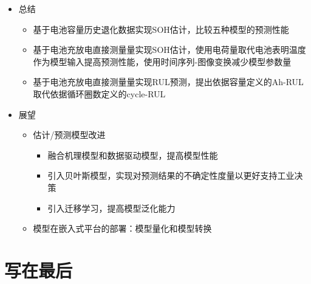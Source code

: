 \documentclass{beamer}
\begin{document}
\begin{frame}
	\begin{itemize}
		\item 总结
			\begin{itemize}
				\item 基于电池容量历史退化数据实现SOH估计，比较五种模型的预测性能
				\item 基于电池充放电直接测量量实现SOH估计，使用电荷量取代电池表明温度作为模型输入提高预测性能，使用时间序列-图像变换减少模型参数量
				\item 基于电池充放电直接测量量实现RUL预测，提出依据容量定义的Ah-RUL取代依据循环圈数定义的cycle-RUL
			\end{itemize}
		\item 展望
			\begin{itemize}
				\item 估计/预测模型改进
					\begin{itemize}
						\item 融合机理模型和数据驱动模型，提高模型性能
						\item 引入贝叶斯模型，实现对预测结果的不确定性度量以更好支持工业决策
						\item 引入迁移学习，提高模型泛化能力
					\end{itemize}
				\item 模型在嵌入式平台的部署：模型量化和模型转换
			\end{itemize}
	\end{itemize}
\end{frame}

\section{写在最后}
\end{document}
